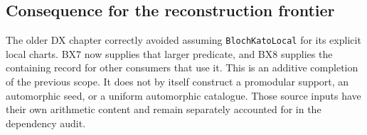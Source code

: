 \subsection{Consequence for the reconstruction frontier}

The older DX chapter correctly avoided assuming
\texttt{Bloch\allowbreak Kato\allowbreak Local} for its explicit local charts.
BX7 now supplies that larger predicate, and BX8
supplies the containing record for other consumers
that use it.  This is an additive completion of the
previous scope.  It does not by itself construct a
promodular support, an automorphic seed, or a uniform
automorphic catalogue.  Those source inputs have
their own arithmetic content and remain separately
accounted for in the dependency audit.

